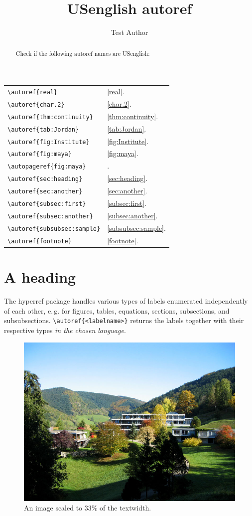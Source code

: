 \documentclass{snapshotmfo}
\author{Test Author}
\title{USenglish autoref}
\begin{document}
	\begin{abstract}
		Check if the following autoref names are USenglish:
	\end{abstract}
	
	\noindent\begin{tabular}{@{}l@{\quad yields\quad}l@{}}
		\verb+\autoref{real}+             &\autoref{real}.\\
		\verb+\autoref{char.2}+           &\autoref{char.2}.\\
		\verb+\autoref{thm:continuity}+   &\autoref{thm:continuity}.\\
		\verb+\autoref{tab:Jordan}+       &\autoref{tab:Jordan}.\\
		\verb+\autoref{fig:Institute}+    &\autoref{fig:Institute}.\\
		\verb+\autoref{fig:maya}+         &\autoref{fig:maya}.\\
		\verb+\autopageref{fig:maya}+     &\autopageref{fig:maya}.\\
		\verb+\autoref{sec:heading}+      &\autoref{sec:heading}.\\
		\verb+\autoref{sec:another}+      &\autoref{sec:another}.\\
		\verb+\autoref{subsec:first}+     &\autoref{subsec:first}.\\
		\verb+\autoref{subsec:another}+   &\autoref{subsec:another}.\\
		\verb+\autoref{subsubsec:sample}+ &\autoref{subsubsec:sample}.\\
		\verb+\autoref{footnote}+         &\autoref{footnote}.\\
	\end{tabular}
	
	
	\section{A heading}
	\label{sec:heading}
	The hyperref package handles various types of labels enumerated independently of each other, e.\,g.
	for figures, tables, equations, sections, subsections, and subsubsections.
	\verb+\autoref{<labelname>}+ returns the labels together with their respective types {\em in the chosen language}.
	
	\begin{figure}[ht]
		\centering 
		\includegraphics[width= 0.33 \textwidth]{mfo.jpg}
		\caption{An image scaled to 33\% of the textwidth.}
		\label{fig:Institute}
	\end{figure}
	
\end{document}
